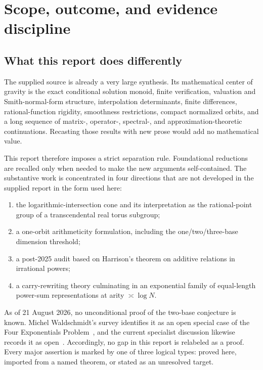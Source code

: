 \documentclass[11pt,oneside]{article}
\theoremstyle{definition}
\begin{document}
\tableofcontents
\newpage

\section{Scope, outcome, and evidence discipline}

\subsection{What this report does differently}

The supplied source is already a very large synthesis.  Its mathematical center of gravity is the exact conditional solution monoid, finite verification, valuation and Smith-normal-form structure, interpolation determinants, finite differences, rational-function rigidity, smoothness restrictions, compact normalized orbits, and a long sequence of matrix-, operator-, spectral-, and approximation-theoretic continuations.  Recasting those results with new prose would add no mathematical value.

This report therefore imposes a strict separation rule.  Foundational reductions are recalled only when needed to make the new arguments self-contained.  The substantive work is concentrated in four directions that are not developed in the supplied report in the form used here:

\begin{enumerate}
\item the logarithmic-intersection cone and its interpretation as the rational-point group of a transcendental real torus subgroup;
\item a one-orbit arithmeticity formulation, including the one/two/three-base dimension threshold;
\item a post-2025 audit based on Harrison's theorem on additive relations in irrational powers;
\item a carry-rewriting theory culminating in an exponential family of equal-length power-sum representations at arity $\asymp\log N$.
\end{enumerate}

\begin{statusbox}
As of 21 August 2026, no unconditional proof of the two-base conjecture is known.  Michel Waldschmidt's survey identifies it as an open special case of the Four Exponentials Problem~\cite{Waldschmidt2023}, and the current specialist discussion likewise records it as open~\cite{MathOverflow2026}.  Accordingly, no gap in this report is relabeled as a proof.  Every major assertion is marked by one of three logical types: proved here, imported from a named theorem, or stated as an unresolved target.
\end{statusbox}
\end{document}
